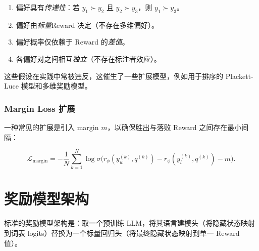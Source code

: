 \begin{keybox}
\begin{enumerate}
  \item 偏好具有\emph{传递性}：若 $y_1 \succ y_2$ 且 $y_2 \succ y_3$，则 $y_1 \succ y_3$。
  \item 偏好由\emph{标量}Reward 决定（不存在多维偏好）。
  \item 偏好概率仅依赖于 Reward 的\emph{差值}。
  \item 各偏好对之间相互\emph{独立}（不存在标注者效应）。
\end{enumerate}

这些假设在实践中常被违反，这催生了一些扩展模型，例如用于排序的 Plackett-Luce 模型和多维奖励模型。
\end{keybox}

\subsubsection*{Margin Loss 扩展}
\label{margin-loss-extension}

一种常见的扩展是引入 margin $m$，以确保胜出与落败 Reward 之间存在最小间隔：

\[
\mathcal{L}_{\text{margin}} =
    -\frac{1}{N}\sum_{k=1}^N \log \sigma\!\bigl(r_\phi(y_w^{(k)}, q^{(k)}) - r_\phi(y_l^{(k)}, q^{(k)}) - m\bigr).
\]

\section{奖励模型架构}
\label{sec:rm-architectures}

\begin{intuitionbox}[LLM 上的分类头]
标准的奖励模型架构是：取一个预训练 LLM，将其语言建模头（将隐藏状态映射到词表 logits）替换为一个标量回归头（将最终隐藏状态映射到单一 Reward 值）。
\end{intuitionbox}

